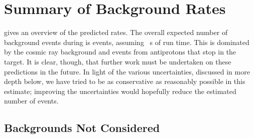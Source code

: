 %

\section{Summary of Background Rates}
\TabBackgroundFinalVals
{} gives an overview of the predicted rates.
The overall expected number of background events during \phaseII is \VarTotalBgPhasII events, assuming \VarRunTime~s of run time.
This is dominated by the cosmic ray background and events from antiprotons that stop in the target.
It is clear, though, that further work must be undertaken on these predictions in the future.
In light of the various uncertainties, discussed in more depth below, we have tried to be as conservative as reasonably possible in this estimate; improving the uncertainties would hopefully reduce the estimated number of events.

\clearpage
\subsection{Backgrounds Not Considered}
